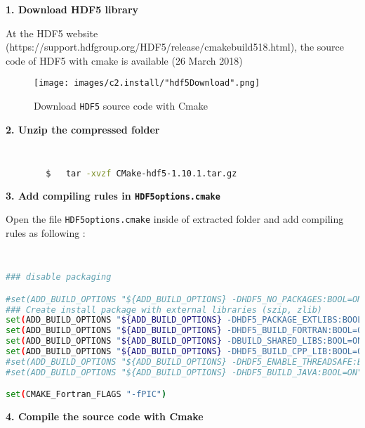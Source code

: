 		\vspace{0.5cm}
		
		\textbf{1. Download HDF5 library}
		
		At the HDF5 website (https://support.hdfgroup.org/HDF5/release/cmakebuild518.html), the source code of HDF5 with cmake is available (26 March 2018)
		
		\vspace{0.5cm}
		{
			\begin{figure} [H]
				\centering
				\begin{tcolorbox}[standard jigsaw,opacityback=0]
					\texttt{[image: images/c2.install/"hdf5Download".png]}
				\end{tcolorbox}
				\vspace{0.3cm}
				\caption{Download \texttt{HDF5} source code with Cmake}			
				\label{fig:hdf5download}
			\end{figure}
		}
	
		\textbf{2. Unzip the compressed folder}
		
		\begin{lstlisting}[language=bash]
		

		$	tar -xvzf CMake-hdf5-1.10.1.tar.gz
		\end{lstlisting}
		
		\pagebreak		
		\textbf{3. Add compiling rules in \texttt{HDF5options.cmake}}
		
		Open the file \texttt{HDF5options.cmake} inside of extracted folder and add compiling rules as following : 
		
		\begin{lstlisting}[language=bash]
		

### disable packaging

#set(ADD_BUILD_OPTIONS "${ADD_BUILD_OPTIONS} -DHDF5_NO_PACKAGES:BOOL=ON")
### Create install package with external libraries (szip, zlib)
set(ADD_BUILD_OPTIONS "${ADD_BUILD_OPTIONS} -DHDF5_PACKAGE_EXTLIBS:BOOL=ON")
set(ADD_BUILD_OPTIONS "${ADD_BUILD_OPTIONS} -DHDF5_BUILD_FORTRAN:BOOL=ON")
set(ADD_BUILD_OPTIONS "${ADD_BUILD_OPTIONS} -DBUILD_SHARED_LIBS:BOOL=ON")
set(ADD_BUILD_OPTIONS "${ADD_BUILD_OPTIONS} -DHDF5_BUILD_CPP_LIB:BOOL=ON")
#set(ADD_BUILD_OPTIONS "${ADD_BUILD_OPTIONS} -DHDF5_ENABLE_THREADSAFE:BOOL=ON")
#set(ADD_BUILD_OPTIONS "${ADD_BUILD_OPTIONS} -DHDF5_BUILD_JAVA:BOOL=ON")

set(CMAKE_Fortran_FLAGS "-fPIC")
		\end{lstlisting}
		
		\vspace{1em}
		\textbf{4. Compile the source code with Cmake}
		
